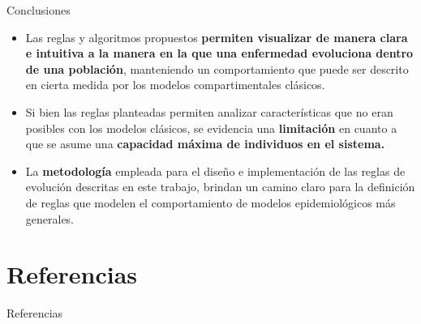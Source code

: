 \documentclass[9pt]{beamer}
\begin{document}
\begin{frame}{Conclusiones}
\begin{itemize}
    \item Las reglas y algoritmos propuestos \textbf{permiten visualizar de manera clara e intuitiva a la manera en la que una enfermedad evoluciona dentro de una población}, manteniendo un comportamiento que puede ser descrito en cierta medida por los modelos compartimentales clásicos.
    \item Si bien las reglas planteadas permiten analizar características que no eran posibles con los modelos clásicos, se evidencia una \textbf{limitación} en cuanto a que se asume una \textbf{capacidad máxima de individuos en el sistema.}
    \item La \textbf{metodología} empleada para el diseño e implementación de las reglas de evolución descritas en este trabajo, brindan un camino claro para la definición de reglas que modelen el comportamiento de modelos epidemiológicos más generales.
\end{itemize}
\end{frame}

\section{Referencias}
\begin{frame}[allowframebreaks]{Referencias}

\end{frame}
\end{document}
